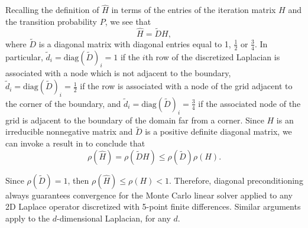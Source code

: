 \documentclass[final,leqno,onefignum,onetabnum]{siamltex1213}
\begin{document}
Recalling the definition of $\hat{H}$ in terms of the entries of the
iteration matrix $H$ and the transition probability $P$, we see that
\[
 \hat{H}=\tilde{D}H,
\]
where $\tilde{D}$ is a diagonal matrix with diagonal entries equal to
1, $\frac{1}{2}$ or $\frac{3}{4}$.
In particular, $\tilde{d}_i=\text{diag}(\tilde D)_i=1$ if the $i$th row of the
discretized Laplacian is associated with a node which is not adjacent to the
boundary, $\tilde{d}_i=\text{diag}(\tilde D)_i=\frac{1}{2}$ if the row is associated
with a node of the grid adjacent to the corner of the boundary,
and $\tilde{d}_i=\text{diag}(\tilde D)_i=\frac{3}{4}$ if the associated node of the grid
is adjacent to the boundary of the domain far from a corner.
Since $H$ is an irreducible nonnegative matrix and $\tilde{D}$ is a
positive definite diagonal matrix, we can invoke a result in 
\cite{FK1975} to conclude that
\[
 \rho(\hat{H})=\rho(\tilde{D}H)\le \rho(\tilde D)\rho(H).
\]

Since $\rho(\tilde{D})=1$, then $\rho(\hat{H})\le \rho(H)<1$.
Therefore, diagonal preconditioning always guarantees convergence
for the Monte Carlo linear solver applied to any 2D Laplace
operator discretized with 5-point finite differences. 
Similar arguments apply to the $d$-dimensional Laplacian, for any $d$. 
\end{document}
